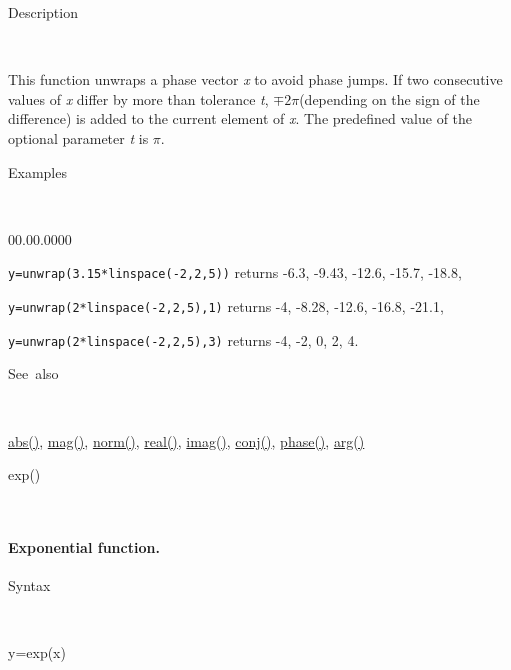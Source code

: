 \begin{description}
\item [Description]~
\end{description}
This function unwraps a phase vector \textit{x} to avoid phase jumps.
If two consecutive values of \textit{x} differ by more than tolerance
\textit{t}, $\mp2\pi$(depending on the sign of the difference) is
added to the current element of \textit{x}. The predefined value of
the optional parameter \textit{t} is $\pi$.

\begin{description}
\item [Examples]~
\end{description}
\begin{lyxlist}{00.00.0000}
\item [\texttt{y=unwrap(3.15{*}linspace(-2,2,5))}]returns -6.3, -9.43,
-12.6, -15.7, -18.8,
\end{lyxlist}
\texttt{y=unwrap(2{*}linspace(-2,2,5),1)} returns -4, -8.28, -12.6,
-16.8, -21.1,

\noindent \texttt{y=unwrap(2{*}linspace(-2,2,5),3)} returns -4, -2,
0, 2, 4.

\begin{description}
\item [See~also]~
\end{description}
\textcolor{blue}{\hyperlink{abs}{abs()}}, \textcolor{blue}{\hyperlink{mag}{mag()}},
\textcolor{blue}{\hyperlink{norm}{norm()}}, \textcolor{blue}{\hyperlink{real}{real()}},
\textcolor{blue}{\hyperlink{imag}{imag()}}, \textcolor{blue}{\hyperlink{conj}{conj()}},
\textcolor{blue}{\hyperlink{phase}{phase()}}, \textcolor{blue}{\hyperlink{arg}{arg()}}


\newpage
{}

\begin{description}
\item [\hypertarget{exp}{}{\Large exp()}]~{\Large \par}
\end{description}

\paragraph{\label{par:Exponential-function}Exponential function.}

\begin{description}
\item [Syntax]~
\end{description}
y=exp(x)

